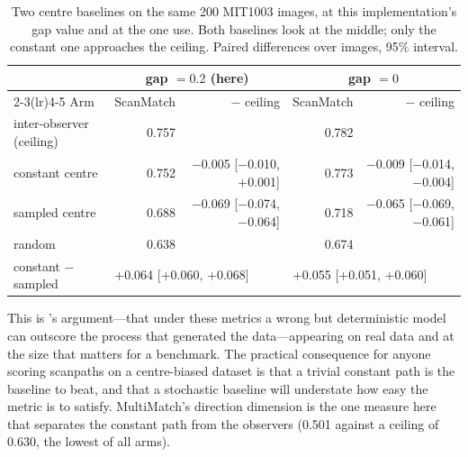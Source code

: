 \documentclass[11pt,a4paper]{article}
\begin{document}
\begin{table}[t]
\caption{Two centre baselines on the same 200 MIT1003 images, at this
implementation's gap value and at the one \citet{cristino2010} use. Both
baselines look at the middle; only the constant one approaches the ceiling.
Paired differences over images, 95\% interval.}
\label{tab:centre}
\small
\begin{tabular}{@{}lrrrr@{}}
\toprule
 & \multicolumn{2}{c}{gap $=0.2$ (here)} & \multicolumn{2}{c}{gap $=0$ \citep{cristino2010}} \\
\cmidrule(lr){2-3}\cmidrule(lr){4-5}
Arm & ScanMatch & $-$ ceiling & ScanMatch & $-$ ceiling \\
\midrule
inter-observer (ceiling) & 0.757 & & 0.782 & \\
constant centre          & 0.752 & $-$0.005 [$-$0.010, +0.001] & 0.773 & $-$0.009 [$-$0.014, $-$0.004] \\
sampled centre           & 0.688 & $-$0.069 [$-$0.074, $-$0.064] & 0.718 & $-$0.065 [$-$0.069, $-$0.061] \\
random                   & 0.638 & & 0.674 & \\
\midrule
constant $-$ sampled     & \multicolumn{2}{l}{+0.064 [+0.060, +0.068]} & \multicolumn{2}{l}{+0.055 [+0.051, +0.060]} \\
\bottomrule
\end{tabular}
\end{table}

This is \citet{kummerer2021}'s argument---that under these metrics a wrong but
deterministic model can outscore the process that generated the data---appearing
on real data and at the size that matters for a benchmark. The practical
consequence for anyone scoring scanpaths on a centre-biased dataset is that a
trivial constant path is the baseline to beat, and that a stochastic baseline
will understate how easy the metric is to satisfy. MultiMatch's direction
dimension is the one measure here that separates the constant path from the
observers (0.501 against a ceiling of 0.630, the lowest of all arms).
\end{document}
